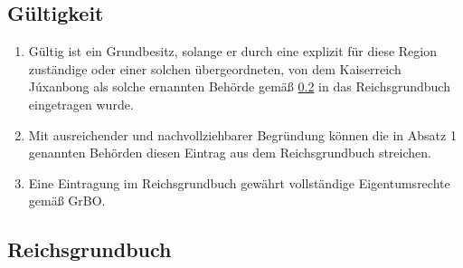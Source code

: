 \documentclass{article}
\begin{document}
\subsection{Gültigkeit}
\begin{enumerate}[(1)]
    \item Gültig ist ein Grundbesitz, solange er durch eine explizit für diese Region zuständige oder einer solchen übergeordneten, von dem
    Kaiserreich Júxanbong als solche ernannten Behörde gemäß \ref{rgbuch} in das Reichsgrundbuch eingetragen wurde.
    \item Mit ausreichender und nachvollziehbarer Begründung können die in Absatz 1 genannten Behörden diesen Eintrag aus dem Reichsgrundbuch streichen.
    \item Eine Eintragung im Reichsgrundbuch gewährt vollständige Eigentumsrechte gemäß GrBO.
\end{enumerate}
\subsection{Reichsgrundbuch}\label{rgbuch}
\end{document}
